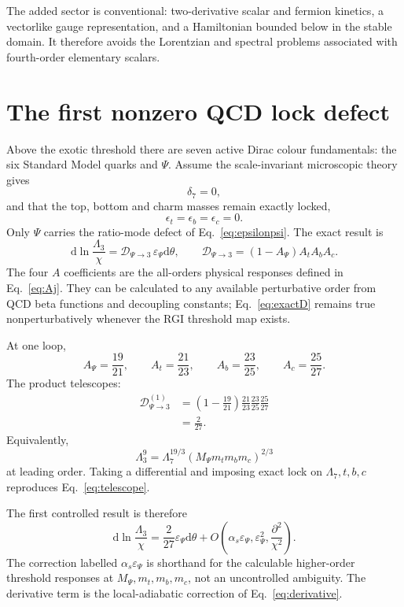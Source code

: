 \documentclass[11pt,a4paper]{article}
\newcommand{\dd}{\mathrm{d}}
\begin{document}
The added sector is conventional: two-derivative scalar and fermion kinetics, a vectorlike gauge representation, and a Hamiltonian bounded below in the stable domain. It therefore avoids the Lorentzian and spectral problems associated with fourth-order elementary scalars.

\section{The first nonzero QCD lock defect}
\label{sec:firstdefect}

Above the exotic threshold there are seven active Dirac colour fundamentals: the six Standard Model quarks and $\Psi$. Assume the scale-invariant microscopic theory gives
\[
\delta_7=0,
\]
and that the top, bottom and charm masses remain exactly locked,
\[
\epsilon_t=\epsilon_b=\epsilon_c=0.
\]
Only $\Psi$ carries the ratio-mode defect of Eq.~\eqref{eq:epsilonpsi}. The exact result is
\[
\boxed{
\dd\ln\frac{\Lambda_3}{\chi}
=\mathcal D_{\Psi\to3}\,
\varepsilon_\Psi\dd\theta,
\qquad
\mathcal D_{\Psi\to3}
=(1-A_\Psi)A_tA_bA_c.
}
\label{eq:exactD}
\]
The four $A$ coefficients are the all-orders physical responses defined in Eq.~\eqref{eq:Aj}. They can be calculated to any available perturbative order from QCD beta functions and decoupling constants; Eq.~\eqref{eq:exactD} remains true nonperturbatively whenever the RGI threshold map exists.

At one loop,
\[
A_\Psi=\frac{19}{21},
\qquad
A_t=\frac{21}{23},
\qquad
A_b=\frac{23}{25},
\qquad
A_c=\frac{25}{27}.
\]
The product telescopes:
\begin{align}
\mathcal D_{\Psi\to3}^{(1)}
&=\left(1-\frac{19}{21}\right)
\frac{21}{23}\frac{23}{25}\frac{25}{27}
\nonumber\\
&=\boxed{\frac{2}{27}}.
\label{eq:telescope}
\end{align}
Equivalently,
\[
\boxed{
\Lambda_3^9
=\Lambda_7^{19/3}
\left(M_\Psi m_tm_bm_c\right)^{2/3}
}
\label{eq:lambdaidentity}
\]
at leading order. Taking a differential and imposing exact lock on $\Lambda_7,t,b,c$ reproduces Eq.~\eqref{eq:telescope}.

The first controlled result is therefore
\[
\boxed{
\dd\ln\frac{\Lambda_3}{\chi}
=\frac{2}{27}\varepsilon_\Psi\dd\theta
+O\!\left(
\alpha_s\varepsilon_\Psi,
\varepsilon_\Psi^2,
\frac{\partial^2}{\chi^2}
\right).
}
\label{eq:qcddefect}
\]
The correction labelled $\alpha_s\varepsilon_\Psi$ is shorthand for the calculable higher-order threshold responses at $M_\Psi,m_t,m_b,m_c$, not an uncontrolled ambiguity. The derivative term is the local-adiabatic correction of Eq.~\eqref{eq:derivative}.
\end{document}
